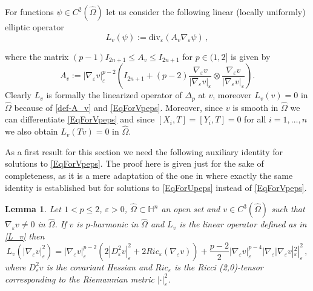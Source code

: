 \documentclass[10pt]{amsart}
\numberwithin{equation}{section}
\newtheorem{lemma}[theorem]{Lemma}
\theoremstyle{definition}
\newcommand{\eps}{\varepsilon}
\newcommand{\He}{\mathbb{H}}
\newcommand{\egrad}{\nabla_{\eps}}
\newcommand{\ediv}{\mathrm{div}_{\eps}}
\begin{document}
For functions $\psi \in C^2(\widehat{\Omega})$ let us consider the following linear (locally uniformly) elliptic operator
\begin{equation}
\label{L_v}
L_v (\psi) := \ediv (A_v \egrad \psi) \, ,
\end{equation}

\noindent where the matrix $(p-1) I_{2n+1} \leq A_v \leq I_{2n+1}$ for $p \in (1,2]$ is given by
\begin{equation}
\label{def-A_v} A_v := |\egrad v|_\varepsilon^{p-2} \left( I_{2n+1} + (p-2) \dfrac{\egrad v}{|\egrad v|_\varepsilon} \otimes \dfrac{\egrad v}{|\egrad v|_\varepsilon} \right).
\end{equation}
Clearly $L_v$ is formally the linearized operator of $\Delta_p$ at $v$, moreover $L_v(v)=0$ in $\widehat{\Omega}$ because of \eqref{def-A_v} and \eqref{EqForVpeps}. Moreover, since $ v$ is smooth in $\widehat{\Omega}$ we can differentiate \eqref{EqForVpeps} and since $[X_i,T]=[Y_i,T]=0$ for all $i=1, \ldots, n$ we also obtain $L_v(T v)=0$ in $\widehat{\Omega}$.

As a first result for this section we need the following auxiliary identity for solutions to \eqref{EqForVpeps}. The proof here is given just for the sake of completeness, as it is a mere adaptation of the one in \cite[Lemma 2.1]{KotschwarNi} where exactly the same identity is established but for solutions to \eqref{EqForUpeps} instead of \eqref{EqForVpeps}.  

\begin{lemma}\label{lem:2.1_Kotschwar_Ni}
Let $1<p \leq 2$, $\varepsilon >0$, $\widehat{\Omega} \subset \He^n$ an open set and $v\in C^3(\widehat{\Omega})$ such that $\nabla_\varepsilon v \neq 0$ in $\widehat{\Omega}$. If $v$ is $p$-harmonic in $\widehat{\Omega}$ and $L_v$ is the linear operator defined as in \eqref{L_v} then 
\begin{equation}
\label{KN-identity}
L_v(|\egrad v|_\varepsilon^2) = |\egrad v|_\varepsilon^{p-2} \left( 2|D^2_\varepsilon v |_\varepsilon^2 +2 Ric_\varepsilon(\nabla_\varepsilon v) \right) + \dfrac{p-2}{2} |\egrad v|_\varepsilon^{p-4} |\egrad |\egrad v|_\varepsilon^2|_\varepsilon^{2} \, ,
\end{equation}
where $D^2_\varepsilon v$ is the covariant Hessian and $Ric_\varepsilon$ is the Ricci (2,0)-tensor corresponding to the Riemannian metric $|\cdot|^2_\varepsilon$.
\end{lemma}
\end{document}
